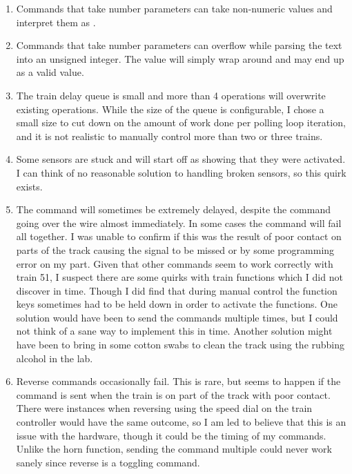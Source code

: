 \documentclass[pdftex,10pt,a4paper]{article}
\begin{document}
\begin{enumerate}

\item Commands that take number parameters can take non-numeric values
  and interpret them as .

\item Commands that take number parameters can overflow while parsing
  the text into an unsigned integer. The value will simply wrap around
  and may end up as a valid value.

\item The train delay queue is small and more than 4 operations will
  overwrite existing operations. While the size of the queue is
  configurable, I chose a small size to cut down on the amount of work
  done per polling loop iteration, and it is not realistic to manually
  control more than two or three trains.

\item Some sensors are stuck and will start off as showing that they
  were activated. I can think of no reasonable solution to handling
  broken sensors, so this quirk exists.

\item The  command will sometimes be extremely delayed,
  despite the command going over the wire almost immediately. In some
  cases the command will fail all together. I was unable to confirm if
  this was the result of poor contact on parts of the track causing
  the signal to be missed or by some programming error on my
  part. Given that other commands seem to work correctly with train
  51, I suspect there are some quirks with train functions which I did
  not discover in time. Though I did find that during manual control
  the function keys sometimes had to be held down in order to activate
  the functions. One solution would have been to send the commands
  multiple times, but I could not think of a sane way to implement
  this in time. Another solution might have been to bring in some
  cotton swabs to clean the track using the rubbing alcohol in the
  lab.

\item Reverse commands occasionally fail. This is rare, but seems to
  happen if the command is sent when the train is on part of the track
  with poor contact. There were instances when reversing using the
  speed dial on the train controller would have the same outcome, so I
  am led to believe that this is an issue with the hardware, though it
  could be the timing of my commands. Unlike the horn function,
  sending the command multiple could never work sanely since reverse
  is a toggling command.


\end{enumerate}
\end{document}
